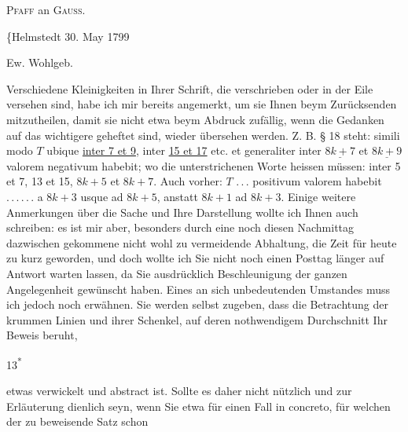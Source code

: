 \NoSourceHead
{}
\begin{center}\large\textsc{Pfaff} an \textsc{Gauss}.\end{center}
\begin{flushright}\{Helmstedt 30. May 1799\end{flushright}
\begin{center}Ew. Wohlgeb.\end{center}
\noindent{}\par
\noindent\hspace*{\parindent}Verschiedene Kleinigkeiten in Ihrer Schrift, die verschrieben oder in der
Eile versehen sind, habe ich mir bereits angemerkt, um sie Ihnen beym Zurücksenden mitzutheilen,
damit sie nicht etwa beym Abdruck zufällig, wenn die Gedanken auf das wichtigere geheftet sind,
wieder übersehen werden. Z. B. § 18 steht: simili modo $T$ ubique \underline{inter 7 et 9},
inter \underline{15 et 17} etc. et generaliter inter $\underline{8k+7}$ et $\underline{8k+9}$
valorem negativum habebit; wo die unterstrichenen Worte heissen müssen: inter 5 et 7,
13 et 15, $8k+5$ et $8k+7$. Auch vorher: $T$ .\,.\,. positivum valorem habebit
.\,.\,.\,.\,.\,. a $8k+3$ usque ad $8k+5$, anstatt $8k+1$ ad $8k+3$.
Einige weitere Anmerkungen über die Sache und Ihre Darstellung wollte ich Ihnen auch schreiben:
es ist mir aber, besonders durch eine noch diesen Nachmittag dazwischen gekommene nicht wohl
zu vermeidende Abhaltung, die Zeit für heute zu kurz geworden, und doch wollte ich Sie nicht
noch einen Posttag länger auf Antwort warten lassen, da Sie ausdrücklich Beschleunigung der
ganzen Angelegenheit gewünscht haben. Eines an sich unbedeutenden Umstandes muss ich jedoch
noch erwähnen. Sie werden selbst zugeben, dass die Betrachtung der krummen Linien und ihrer
Schenkel, auf deren nothwendigem Durchschnitt Ihr Beweis beruht,
\par\vfill\noindent\hfill 13\textsuperscript{*}\par
\clearpage
{}
\noindent etwas verwickelt und abstract ist. Sollte es daher nicht nützlich und zur Erläuterung
dienlich seyn, wenn Sie etwa für einen Fall in concreto, für welchen der zu beweisende Satz schon
